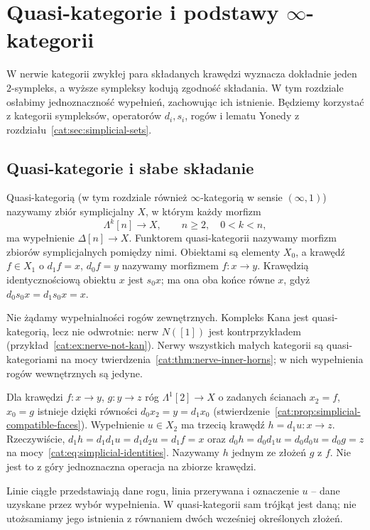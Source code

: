 \section{Quasi-kategorie i podstawy $\infty$-kategorii}\label{cat:sec:quasicategories}

W nerwie kategorii zwykłej para składanych krawędzi wyznacza dokładnie jeden $2$-sympleks, a wyższe sympleksy kodują zgodność składania. W tym rozdziale osłabimy jednoznaczność wypełnień, zachowując ich istnienie. Będziemy korzystać z kategorii sympleksów, operatorów $d_i,s_i$, rogów i lematu Yonedy z rozdziału~\ref{cat:sec:simplicial-sets}.

\subsection{Quasi-kategorie i słabe składanie}

\begin{definicja}\label{cat:def:quasicategory}
Quasi-kategorią (w tym rozdziale również $\infty$-kategorią w sensie $(\infty,1)$) nazywamy zbiór symplicjalny $X$, w którym każdy morfizm
\[
 \Lambda^k[n]\longrightarrow X,\qquad n\geq2,\quad 0<k<n,
\]
ma wypełnienie $\Delta[n]\to X$. Funktorem quasi-kategorii nazywamy morfizm zbiorów symplicjalnych pomiędzy nimi. Obiektami są elementy $X_0$, a krawędź $f\in X_1$ o $d_1f=x$, $d_0f=y$ nazywamy morfizmem $f:x\to y$. Krawędzią identycznościową obiektu $x$ jest $s_0x$; ma ona oba końce równe $x$, gdyż $d_0s_0x=d_1s_0x=x$.
\end{definicja}
Nie żądamy wypełnialności rogów zewnętrznych. Kompleks Kana jest quasi-kategorią, lecz nie odwrotnie: nerw $N([1])$ jest kontrprzykładem (przykład~\ref{cat:ex:nerve-not-kan}). Nerwy wszystkich małych kategorii są quasi-kategoriami na mocy twierdzenia~\ref{cat:thm:nerve-inner-horns}; w nich wypełnienia rogów wewnętrznych są jedyne.

Dla krawędzi $f:x\to y$, $g:y\to z$ róg $\Lambda^1[2]\to X$ o zadanych ścianach $x_2=f$, $x_0=g$ istnieje dzięki równości $d_0x_2=y=d_1x_0$ (stwierdzenie~\ref{cat:prop:simplicial-compatible-faces}). Wypełnienie $u\in X_2$ ma trzecią krawędź $h=d_1u:x\to z$. Rzeczywiście, $d_1h=d_1d_1u=d_1d_2u=d_1f=x$ oraz $d_0h=d_0d_1u=d_0d_0u=d_0g=z$ na mocy~\eqref{cat:eq:simplicial-identities}. Nazywamy $h$ jednym ze złożeń $g$ z $f$. Nie jest to z góry jednoznaczna operacja na zbiorze krawędzi.

\begin{center}
\end{center}
Linie ciągłe przedstawiają dane rogu, linia przerywana i oznaczenie $u$ -- dane uzyskane przez wybór wypełnienia. W quasi-kategorii sam trójkąt jest daną; nie utożsamiamy jego istnienia z równaniem dwóch wcześniej określonych złożeń.

